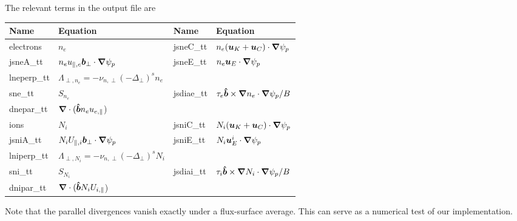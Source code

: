 The relevant terms in the output file are
\begin{longtable}{llll}
\toprule
\rowcolor{gray!50}\textbf{Name} &  \textbf{Equation} & \textbf{Name} &  \textbf{Equation}\\
\midrule
    electrons & $n_e$ &
    jsneC\_tt &$ n_e ( {\boldsymbol{u}}_K + {\boldsymbol{u}}_C )\cdot{\boldsymbol{\nabla}} \psi_p$ \\
    jsneA\_tt &$ n_e u_{\parallel,e} {\boldsymbol{ b}}_\perp  \cdot{\boldsymbol{\nabla}} \psi_p$ &
    jsneE\_tt & $ n_e {\boldsymbol{u}}_E\cdot{\boldsymbol{\nabla}}\psi_p$ \\
    lneperp\_tt &$ \Lambda_{\perp,n_e} = -\nu_{n,\perp} (-\Delta_\perp)^s n_e$&
    & \\
    sne\_tt & $S_{n_e}$ &
    jsdiae\_tt & $\tau_e \bm{\hat{b}} \times {\boldsymbol{\nabla}} n_e \cdot{\boldsymbol{\nabla}} \psi_p /B$\\
    dnepar\_tt & ${\boldsymbol{\nabla}}\cdot (\bm{\hat{b}} n_e u_{e,\parallel}$) &
    & \\
    ions & $N_i$ &
    jsniC\_tt &$ N_i ( {\boldsymbol{u}}_K + {\boldsymbol{u}}_C )\cdot{\boldsymbol{\nabla}} \psi_p$ \\
    jsniA\_tt &$ N_i U_{\parallel,i} {\boldsymbol{ b}}_\perp  \cdot{\boldsymbol{\nabla}} \psi_p$ &
    jsniE\_tt & $ N_i {\boldsymbol{u}}^i_E\cdot{\boldsymbol{\nabla}}\psi_p$ \\
    lniperp\_tt &$ \Lambda_{\perp,N_i} = -\nu_{n,\perp} (-\Delta_\perp)^s N_i$&
    & \\
    sni\_tt & $S_{N_i}$ &
    jsdiai\_tt & $\tau_i \bm{\hat{b}} \times {\boldsymbol{\nabla}} N_i \cdot{\boldsymbol{\nabla}} \psi_p /B$\\
    dnipar\_tt & ${\boldsymbol{\nabla}}\cdot (\bm{\hat{b}} N_i U_{i,\parallel}$) &
      & \\
\bottomrule
\end{longtable}



Note that the parallel divergences vanish exactly under a flux-surface average. This can serve as a numerical test of our implementation.
